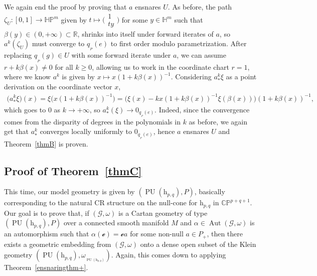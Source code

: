 \documentclass[pdftex]{sigma}
\numberwithin{equation}{section}
\theoremstyle{definition}
\DeclareMathOperator{\Aut}{\mathrm{Aut}}
\DeclareMathOperator{\PU}{\mathrm{PU}}
\newcommand{\MC}[1]{\omega_{{}_{#1}}}
\begin{document}
We again end the proof by proving that $a$ ensnares $U$. As before, the path $\zeta_U\colon [0,1]\to\mathbb{HP}^m$ given by $t\mapsto\bigl(\begin{smallmatrix}1 \\ ty\end{smallmatrix}\bigr)$ for some $y\in\mathbb{H}^m$ such that $\beta(y)\in(0,+\infty)\subset\mathbb{R}$, shrinks into itself under forward iterates of $a$, so $a^k(\zeta_U)$ must converge to $q_{{}_P}(e)$ to first order modulo parametrization. After replacing $q_{{}_P}(g)\in U$ with some forward iterate under $a$, we can assume $r+k\beta(x)\neq 0$ for all $k\geq 0$, allowing us to work in the coordinate chart $r=1$, where we know $a^k$ is given by $x\mapsto x(1+k\beta(x))^{-1}$. Considering $a^k_*\xi$ as a point derivation on the coordinate vector $x$,
\begin{align*}\bigl(a^k_*\xi\bigr)(x)   =\xi\bigl(x(1+k\beta(x))^{-1}\bigr)  =\big(\xi(x)-kx(1+k\beta(x))^{-1}\xi(\beta(x))\big)(1+k\beta(x))^{-1},
\end{align*} which goes to $0$ as $k\rightarrow+\infty$, so $a^k_*(\xi)\rightarrow 0_{q_{{}_P}(e)}$. Indeed, since the convergence comes from the disparity of degrees in the polynomials in $k$ as before, we again get that $a^k_*$ converges locally uniformly to $0_{q_{{}_P}(e)}$, hence $a$ ensnares $U$ and Theorem~\ref{thmB} is proven.

\subsection{Proof of Theorem~\ref{thmC}} This time, our model geometry is given by $(\PU(\mathrm{h}_{p,q}),P)$, basically corresponding to the natural CR structure on the null-cone for $\mathrm{h}_{p,q}$ in $\mathbb{CP}^{p+q+1}$. Our goal is to prove that, if $(\mathscr{G},\omega)$ is a Cartan geometry of type $(\PU(\mathrm{h}_{p,q}),P)$ over a connected smooth manifold $M$ and $\alpha\in\Aut(\mathscr{G},\omega)$ is an automorphism such that $\alpha(\mathscr{e})=\mathscr{e}a$ for some non-null $a\in P_+$, then there exists a geometric embedding from $(\mathscr{G},\omega)$ onto a dense open subset of the Klein geometry $(\PU(\mathrm{h}_{p,q}),\MC{\PU(\mathrm{h}_{p,q})})$. Again, this comes down to applying Theorem~\ref{ensnaringthm+}.
\end{document}
